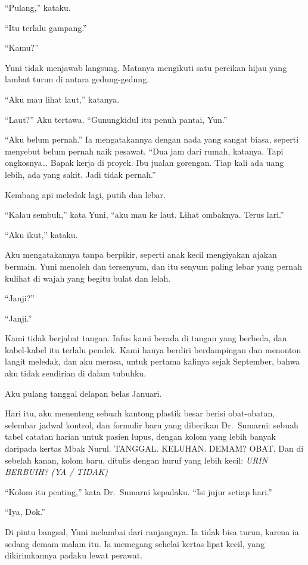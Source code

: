 \documentclass[11pt,twoside,openany]{book}
\makeatletter
\newcommand{\scenebreak}{\par\vspace{0.9em}{\centering\textsc{*\hspace{0.7em}*\hspace{0.7em}*}\par}\vspace{0.9em}\@afterindentfalse\@afterheading}
\makeatother
\begin{document}
``Pulang,'' kataku.

``Itu terlalu gampang.''

``Kamu?''

Yuni tidak menjawab langsung. Matanya mengikuti satu percikan hijau yang lambat turun di antara gedung-gedung.

``Aku mau lihat laut,'' katanya.

``Laut?'' Aku tertawa. ``Gunungkidul itu penuh pantai, Yun.''

``Aku belum pernah.'' Ia mengatakannya dengan nada yang sangat biasa, seperti menyebut belum pernah naik pesawat. ``Dua jam dari rumah, katanya. Tapi ongkosnya\ldots{} Bapak kerja di proyek. Ibu jualan gorengan. Tiap kali ada uang lebih, ada yang sakit. Jadi tidak pernah.''

Kembang api meledak lagi, putih dan lebar.

``Kalau sembuh,'' kata Yuni, ``aku mau ke laut. Lihat ombaknya. Terus lari.''

``Aku ikut,'' kataku.

Aku mengatakannya tanpa berpikir, seperti anak kecil mengiyakan ajakan bermain. Yuni menoleh dan tersenyum, dan itu senyum paling lebar yang pernah kulihat di wajah yang begitu bulat dan lelah.

``Janji?''

``Janji.''

Kami tidak berjabat tangan. Infus kami berada di tangan yang berbeda, dan kabel-kabel itu terlalu pendek. Kami hanya berdiri berdampingan dan menonton langit meledak, dan aku merasa, untuk pertama kalinya sejak September, bahwa aku tidak sendirian di dalam tubuhku.

\scenebreak
Aku pulang tanggal delapan belas Januari.

Hari itu, aku menenteng sebuah kantong plastik besar berisi obat-obatan, selembar jadwal kontrol, dan formulir baru yang diberikan Dr.~Sumarni: sebuah tabel catatan harian untuk pasien lupus, dengan kolom yang lebih banyak daripada kertas Mbak Nurul. TANGGAL. KELUHAN. DEMAM? OBAT. Dan di sebelah kanan, kolom baru, ditulis dengan huruf yang lebih kecil: \emph{URIN BERBUIH? (YA / TIDAK)}

``Kolom itu penting,'' kata Dr.~Sumarni kepadaku. ``Isi jujur setiap hari.''

``Iya, Dok.''

Di pintu bangsal, Yuni melambai dari ranjangnya. Ia tidak bisa turun, karena ia sedang demam malam itu. Ia memegang sehelai kertas lipat kecil, yang dikirimkannya padaku lewat perawat.
\end{document}
